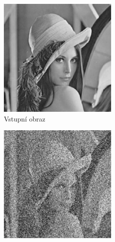 \documentclass[a4paper,10pt]{article}
\begin{document}
\begin{figure}
   \begin{subfigure}[t]{0.3\textwidth}
      \includegraphics[width=\textwidth]{noises1}
      \caption{Vstupní obraz}  
    \end{subfigure}%
%
    \begin{subfigure}[t]{0.3\textwidth}
      \includegraphics[width=\textwidth]{noises2}

\end{subfigure}
\end{figure}
\end{document}
